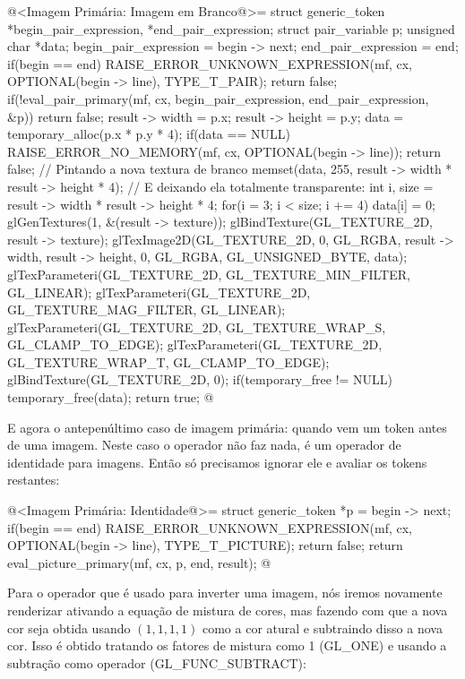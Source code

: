 {{{{{{\iniciocodigo
@<Imagem Primária: Imagem em Branco@>=
struct generic_token *begin_pair_expression, *end_pair_expression;
struct pair_variable p;
unsigned char *data;
begin_pair_expression = begin -> next;
end_pair_expression = end;
if(begin == end){
  RAISE_ERROR_UNKNOWN_EXPRESSION(mf, cx, OPTIONAL(begin -> line), TYPE_T_PAIR);
  return false;
}
if(!eval_pair_primary(mf, cx, begin_pair_expression, end_pair_expression, &p))
  return false;
result -> width = p.x;
result -> height = p.y;
data = temporary_alloc(p.x * p.y * 4);
if(data == NULL){
  RAISE_ERROR_NO_MEMORY(mf, cx, OPTIONAL(begin -> line));
  return false;
}
// Pintando a nova textura de branco
memset(data, 255, result -> width * result -> height * 4);
{ // E deixando ela totalmente transparente:
  int i, size = result -> width * result -> height * 4;
  for(i = 3; i < size; i += 4)
    data[i] = 0;
}
glGenTextures(1, &(result -> texture));
glBindTexture(GL_TEXTURE_2D, result -> texture);
glTexImage2D(GL_TEXTURE_2D, 0, GL_RGBA, result -> width, result -> height, 0,
             GL_RGBA, GL_UNSIGNED_BYTE, data);
glTexParameteri(GL_TEXTURE_2D, GL_TEXTURE_MIN_FILTER, GL_LINEAR);
glTexParameteri(GL_TEXTURE_2D, GL_TEXTURE_MAG_FILTER, GL_LINEAR);
glTexParameteri(GL_TEXTURE_2D, GL_TEXTURE_WRAP_S, GL_CLAMP_TO_EDGE);
glTexParameteri(GL_TEXTURE_2D, GL_TEXTURE_WRAP_T, GL_CLAMP_TO_EDGE);
glBindTexture(GL_TEXTURE_2D, 0);
if(temporary_free != NULL)
  temporary_free(data);
return true;
@
\fimcodigo

E agora o antepenúltimo caso de imagem primária: quando vem um
token \monoespaco{+} antes de uma imagem. Neste caso o operador não faz
nada, é um operador de identidade para imagens. Então só precisamos
ignorar ele e avaliar os tokens restantes:

\iniciocodigo
@<Imagem Primária: Identidade@>=
struct generic_token *p = begin -> next;
if(begin == end){
  RAISE_ERROR_UNKNOWN_EXPRESSION(mf, cx, OPTIONAL(begin -> line),
                                 TYPE_T_PICTURE);
  return false;
}
return eval_picture_primary(mf, cx, p, end, result);
@
\fimcodigo

Para o operador \monoespaco{-} que é usado para inverter uma imagem,
nós iremos novamente renderizar ativando a equação de mistura de
cores, mas fazendo com que a nova cor seja obtida usando $(1, 1, 1,
1)$ como a cor atural e subtraindo disso a nova cor. Isso é obtido
tratando os fatores de mistura como 1 (GL\_ONE) e usando a subtração
como operador (GL\_FUNC\_SUBTRACT):


}}}}}}
